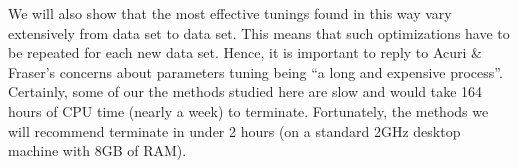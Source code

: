 \documentclass[10pt,conference]{IEEEtran}
\begin{document}
We will also show that the most effective tunings found in this way
  vary extensively from data set to data set.
This means that  such optimizations have to be repeated for each new data set. Hence, it is important
to reply to  Acuri \& Fraser's concerns about parameters tuning being
``a long and expensive process''. Certainly, some of our the methods studied here are  slow and would take  164 hours of CPU time (nearly a week) to terminate. Fortunately, the methods we will recommend
terminate in under 2 hours (on a standard 2GHz desktop machine with 8GB of RAM). 









\end{document}
